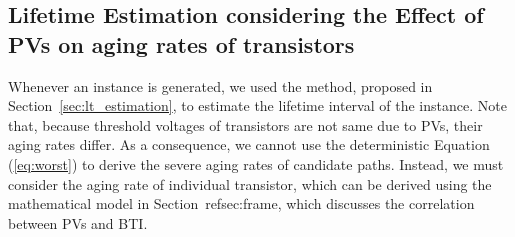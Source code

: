 \subsection{Lifetime Estimation considering the Effect of PVs on aging rates of transistors}
\label{sec:ins:lt}
Whenever an instance is generated, we used the method, proposed in Section~\ref{sec:lt_estimation}, to estimate the lifetime interval of the instance. Note that, because threshold voltages of transistors are not same due to PVs, their aging rates differ. As a consequence, we cannot use the deterministic Equation (\ref{eq:worst}) to derive the severe aging rates of candidate paths. Instead, we must consider the aging rate of individual transistor, which can be derived using the mathematical model in Section~ref{sec:frame}, which discusses the correlation between PVs and BTI.

